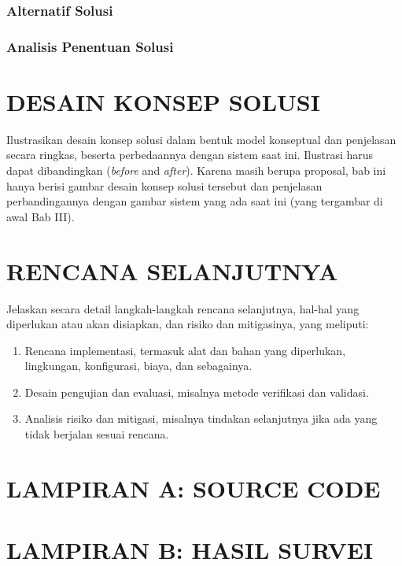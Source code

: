 \documentclass[12pt,a4paper,oneside]{book}
\begin{document}
\subsection{Alternatif Solusi}
\lipsum[8]
\subsection{Analisis Penentuan Solusi}
\lipsum[9]

\chapter{DESAIN KONSEP SOLUSI}
Ilustrasikan desain konsep solusi dalam bentuk model konseptual dan penjelasan secara ringkas, 
beserta perbedaannya dengan sistem saat ini. Ilustrasi harus dapat dibandingkan (\textit{before} and \textit{after}). 
Karena masih berupa proposal, bab ini hanya berisi gambar desain konsep solusi tersebut dan 
penjelasan perbandingannya dengan gambar sistem yang ada saat ini (yang tergambar di awal Bab III).

\chapter{RENCANA SELANJUTNYA}
Jelaskan secara detail langkah-langkah rencana selanjutnya, hal-hal yang diperlukan atau akan disiapkan, dan risiko dan mitigasinya, yang meliputi:
\begin{enumerate}
\item	Rencana implementasi, termasuk alat dan bahan yang diperlukan, lingkungan, konfigurasi, biaya, dan sebagainya.
\item	Desain pengujian dan evaluasi, misalnya metode verifikasi dan validasi.
\item	Analisis risiko dan mitigasi, misalnya tindakan selanjutnya jika ada yang tidak berjalan sesuai rencana.
\end{enumerate}


\backmatter

\printbibliography[title={DAFTAR PUSTAKA}]

\appendix

\chapter{LAMPIRAN A: SOURCE CODE}

\chapter{LAMPIRAN B: HASIL SURVEI}
\end{document}
